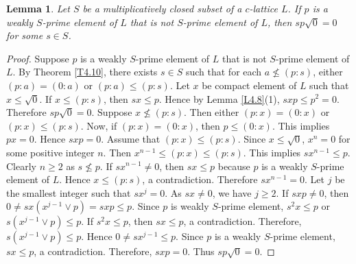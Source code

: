 \documentclass[10pt,twoside,a4paper]{amsart}
\numberwithin{equation}{section}
\theoremstyle{plain}
\newtheorem{lem}{Lemma}[section]
\theoremstyle{definition}
\begin{document}
\begin{lem}%
	Let $S$ be a multiplicatively closed subset of a $c$-lattice $L$. If $p$ is a weakly $S$-prime element of $L$ that is not $S$-prime element of $L$, then $sp\sqrt{0}=0$ for some $s\in S$.
\end{lem}	
\begin{proof}
	Suppose $p$ is a weakly $S$-prime element of $L$ that is not $S$-prime element of $L$.
	By Theorem \ref{T4.10}, there exists $s\in S$ such that for each $a\nleq (p:s)$, either $(p:a)=(0:a)$ or $(p:a)\leq (p:s)$. Let $x$ be compact element of  $L$ such that $x\leq \sqrt{0}$. If $x\leq (p:s)$, then $sx\leq p$. Hence by Lemma \ref{L4.8}(1), $sxp\leq p^2=0$. Therefore $sp\sqrt{0}=0$. Suppose $x\nleq (p:s)$. Then either $(p:x)=(0:x)$ or $(p:x)\leq (p:s)$. Now, if $(p:x)=(0:x)$, then $p\leq (0:x)$. This implies $px=0$. Hence $sxp=0$. Assume that $(p:x)\leq (p:s)$. Since $x\leq \sqrt{0}$, $x^n=0$ for some positive integer $n$. Then $x^{n-1}\leq (p:x)\leq (p:s)$. This implies $sx^{n-1}\leq p$. Clearly $n\geq 2$ as $s\nleq p$. If $sx^{n-1}\neq 0$, then $sx\leq p$ because $p$ is a weakly $S$-prime element of $L$. Hence $x\leq (p:s)$, a contradiction. Therefore $sx^{n-1}=0$. Let $j$ be the smallest integer such that $sx^j=0$. As $sx\neq 0$, we have $j\geq 2$.
	If $sxp\neq 0$, then $0\neq sx(x^{j-1}\vee p)= sxp\leq p$. Since $p$ is weakly $S$-prime element, $s^2x\leq p$ or $s(x^{j-1}\vee p)\leq p$. If $s^2x\leq p$, then $sx\leq p$, a contradiction. Therefore, $s(x^{j-1}\vee p)\leq p$. Hence $0\neq sx^{j-1}\leq p$. Since $p$ is a weakly $S$-prime element, $sx\leq p$, a contradiction. Therefore, $sxp=0$. Thus $sp\sqrt{0}=0$.
\end{proof}
\end{document}
